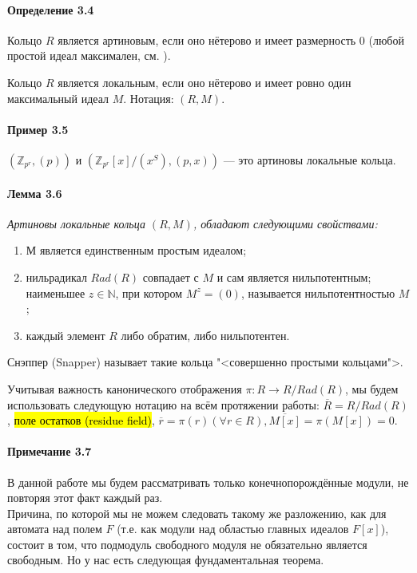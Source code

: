 \documentclass[a4paper,12pt]{article}
\begin{document}
\paragraph{Определение 3.4}
Кольцо $R$ является артиновым, если оно нётерово и имеет размерность 0 (любой простой идеал максимален, см. \cite{bib1}).

Кольцо $R$ является локальным, если оно нётерово и имеет ровно один максимальный идеал $M$. Нотация: $(R,M)$.

\paragraph{Пример 3.5}
$(\mathbb{Z}_{p^r}, (p))$ и $(\mathbb{Z}_{p^r}[x]/(x^S), (p,x))$ --- это артиновы локальные кольца.

\paragraph{Лемма 3.6}{\itshape
Артиновы локальные кольца $(R,M)$, обладают следующими свойствами:
}

\renewcommand{\labelenumi}{(\asbuk{enumi})}
\begin{enumerate}
	\item М является единственным простым идеалом;
	\item нильрадикал $Rad(R)$ совпадает с $M$ и сам является нильпотентным; наименьшее $z \in \mathbb{N}$, при котором $M^z = (0)$, называется нильпотентностью $M$;
	\item каждый элемент $R$ либо обратим, либо нильпотентен.
\end{enumerate}

Снэппер (Snapper) \cite{bib11} называет такие кольца "<совершенно простыми кольцами">.

Учитывая важность канонического отображения $\pi : R \rightarrow R / Rad(R)$, мы будем использовать следующую нотацию на всём протяжении работы: $\overline{R} = R / Rad(R)$, \hl{поле остатков (residue field)}, $\overline{r} = \pi (r) (\forall r \in R), \overline{M[x]} = \pi (M[x]) = 0$.

\paragraph{Примечание 3.7}
В данной работе мы будем рассматривать только конечнопорождённые модули, не повторяя этот факт каждый раз.\\

Причина, по которой мы не можем следовать такому же разложению, как для автомата над полем $F$ (т.е. как модули над областью главных идеалов $F[x]$), состоит в том, что подмодуль свободного модуля не обязательно является свободным. Но у нас есть следующая фундаментальная теорема.
\end{document}
